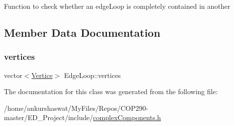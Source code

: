 Function to check whether an edge\+Loop is completely contained in another 

\subsection{Member Data Documentation}
\mbox{\label{classEdgeLoop_a781d9dd73f8b69c7b0075d4297f6b277}} 
\subsubsection{\texorpdfstring{vertices}{vertices}}
{\footnotesize\ttfamily vector$<$\hyperlink{structVertice}{Vertice}$>$ Edge\+Loop\+::vertices}



The documentation for this class was generated from the following file\+:\begin{DoxyCompactItemize}
\item 
/home/ankurshaswat/\+My\+Files/\+Repos/\+C\+O\+P290-\/master/\+E\+D\+\_\+\+Project/include/\hyperlink{complexComponents_8h}{complex\+Components.\+h}\end{DoxyCompactItemize}
